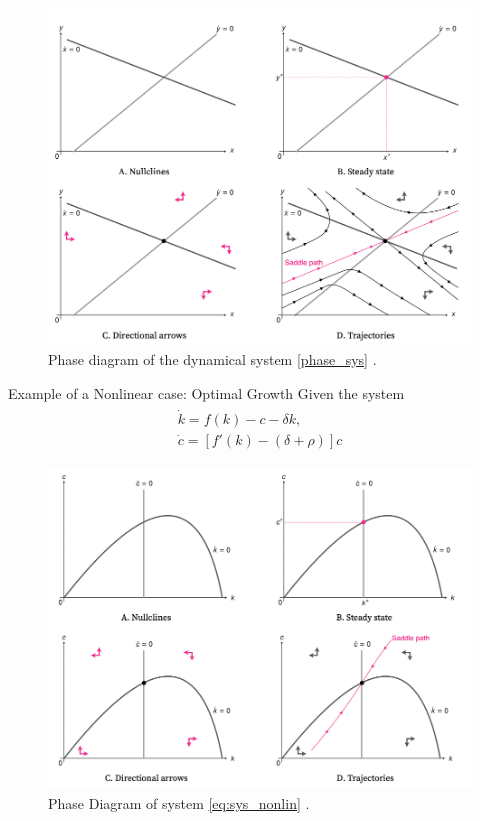 \documentclass[
10pt, %
]{beamer}
\begin{document}
	\begin{frame}
		\begin{figure}[ht]
		\centering
		\includegraphics[scale=0.28]{figs/phasediag.png}
		\caption{Phase diagram of the dynamical system \eqref{phase_sys} \citep{michaillat2023} .}
		\label{fig:exmaple_phase}
	\end{figure}
	\end{frame}

	\begin{frame}{Example of a Nonlinear case: Optimal Growth}
	Given the system
	\begin{align}
		\begin{matrix}
			\dot{k} = f (k) - c - \delta k, \\
			\dot{c} = [ f'(k) - (\delta + \rho) ] c
		\end{matrix} \label{eq:sys_nonlin}
	\end{align}
		\begin{figure}[ht]
		\centering
			\includegraphics[scale=0.2]{figs/phasediag2.png}
		\caption{Phase Diagram of system \eqref{eq:sys_nonlin} \citep{michaillat2023}. }
		\label{fig:exmaple_phase}
	\end{figure}
	\end{frame}
\end{document}
